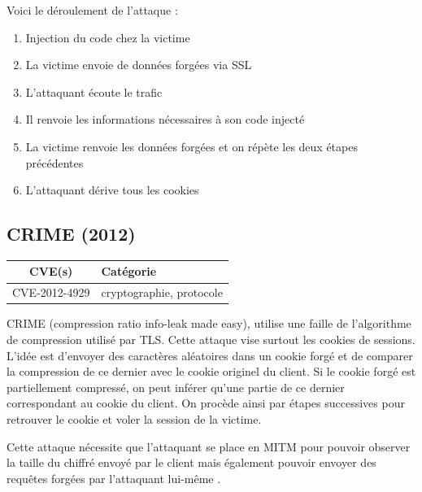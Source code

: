 Voici le déroulement de l'attaque :

\begin{enumerate}
\item Injection du code chez la victime
\item La victime envoie de données forgées via SSL
\item L'attaquant écoute le trafic
\item Il renvoie les informations nécessaires à son code injecté
\item La victime renvoie les données forgées et on répète les deux étapes précédentes
  \item L'attaquant dérive tous les cookies
\end{enumerate}



\subsection{CRIME (2012)}

\begin{tabularx}{0.96\textwidth}{|c|X|}
  \hline
  \textbf{CVE(s)} & \textbf{Catégorie} \\
  \hline
  CVE-2012-4929 & cryptographie, protocole \\
  \hline
\end{tabularx}

\vspace{1em}

CRIME (compression ratio info-leak made easy), utilise une faille de l'algorithme de compression utilisé par TLS. Cette attaque vise surtout les cookies de sessions. L'idée est d'envoyer des caractères aléatoires dans un cookie forgé et de comparer la compression de ce dernier avec le cookie originel du client. Si le cookie forgé est partiellement compressé, on peut inférer qu'une partie de ce dernier correspondant au cookie du client. On procède ainsi par étapes successives pour retrouver le cookie et voler la session de la victime.

Cette attaque nécessite que l'attaquant se place en MITM pour pouvoir observer la taille du chiffré envoyé par le client mais également pouvoir envoyer des requêtes forgées par l'attaquant lui-même \cite{crime}.




